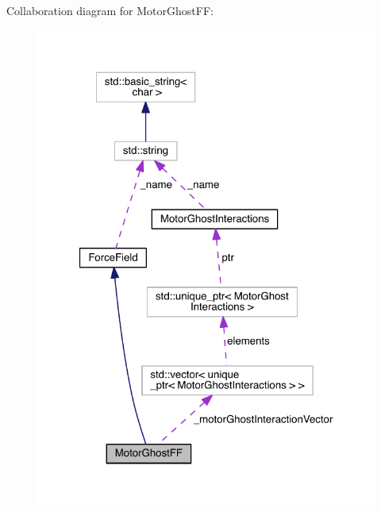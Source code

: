 Collaboration diagram for Motor\+Ghost\+F\+F\+:
\nopagebreak
\begin{figure}[H]
\begin{center}
\leavevmode
\includegraphics[width=321pt]{classMotorGhostFF__coll__graph}
\end{center}
\end{figure}
